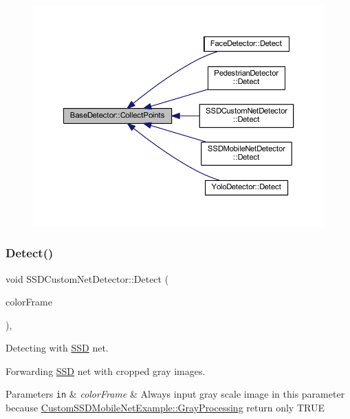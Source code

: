 \begin{figure}[H]
\begin{center}
\leavevmode
\includegraphics[width=350pt]{class_base_detector_a20380b0980c6f262b0829f37fb89d2a7_icgraph}
\end{center}
\end{figure}
\mbox{\label{class_s_s_d_custom_net_detector_abcd14fa695e46fab1eab8ea5524c0ba5}} 
\subsubsection{\texorpdfstring{Detect()}{Detect()}}
{\footnotesize\ttfamily void S\+S\+D\+Custom\+Net\+Detector\+::\+Detect (\begin{DoxyParamCaption}\item[{cv\+::\+U\+Mat \&}]{color\+Frame }\end{DoxyParamCaption})\hspace{0.3cm}{\ttfamily [override]}, {\ttfamily [virtual]}}



Detecting with \mbox{\hyperlink{class_s_s_d}{S\+SD}} net. 

Forwarding \mbox{\hyperlink{class_s_s_d}{S\+SD}} net with cropped gray images.


\begin{DoxyParams}[1]{Parameters}
\mbox{\tt in}  & {\em color\+Frame} & Always input gray scale image in this parameter because \mbox{\hyperlink{class_custom_s_s_d_mobile_net_example_a4c3fe9ac68b5ef4f51d91a6322c5da02}{Custom\+S\+S\+D\+Mobile\+Net\+Example\+::\+Gray\+Processing}} return only T\+R\+UE \\
\hline
\end{DoxyParams}


